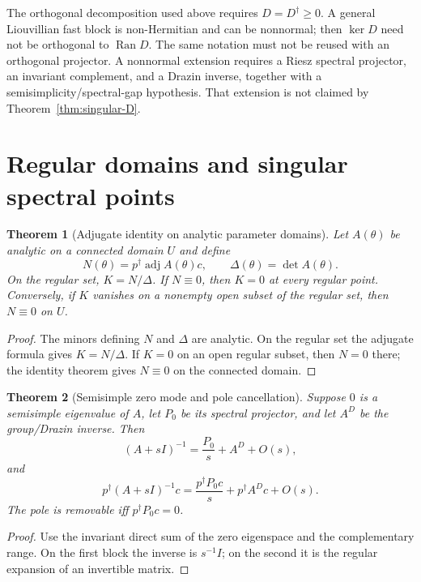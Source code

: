 \documentclass[11pt,a4paper]{article}
\newtheorem{theorem}{Theorem}[section]
\theoremstyle{remark}
\newcommand{\adj}{\operatorname{adj}}
\newcommand{\Ran}{\operatorname{Ran}}
\begin{document}
\begin{scopebox}
The orthogonal decomposition used above requires $D=D^\dagger\ge0$.  A general
Liouvillian fast block is non-Hermitian and can be nonnormal; then
$\ker D$ need not be orthogonal to $\Ran D$.  The same notation must not be
reused with an orthogonal projector.  A nonnormal extension requires a Riesz
spectral projector, an invariant complement, and a Drazin inverse, together
with a semisimplicity/spectral-gap hypothesis.  That extension is not claimed
by Theorem~\ref{thm:singular-D}.
\end{scopebox}

\section{Regular domains and singular spectral points}

\begin{theorem}[Adjugate identity on analytic parameter domains]
Let $A(\theta)$ be analytic on a connected domain $U$ and define
\[
N(\theta)=p^\dagger\adj A(\theta)c,
\qquad
\Delta(\theta)=\det A(\theta).
\]
On the regular set, $K=N/\Delta$.  If $N\equiv0$, then $K=0$ at every regular
point.  Conversely, if $K$ vanishes on a nonempty open subset of the regular
set, then $N\equiv0$ on $U$.
\end{theorem}

\begin{proof}
The minors defining $N$ and $\Delta$ are analytic.  On the regular set the
adjugate formula gives $K=N/\Delta$.  If $K=0$ on an open regular subset, then
$N=0$ there; the identity theorem gives $N\equiv0$ on the connected domain.
\end{proof}

\begin{theorem}[Semisimple zero mode and pole cancellation]
Suppose $0$ is a semisimple eigenvalue of $A$, let $P_0$ be its spectral
projector, and let $A^D$ be the group/Drazin inverse.  Then
\[
(A+sI)^{-1}=\frac{P_0}{s}+A^D+O(s),
\]
and
\[
p^\dagger(A+sI)^{-1}c
=\frac{p^\dagger P_0c}{s}+p^\dagger A^Dc+O(s).
\]
The pole is removable iff $p^\dagger P_0c=0$.
\end{theorem}

\begin{proof}
Use the invariant direct sum of the zero eigenspace and the complementary
range.  On the first block the inverse is $s^{-1}I$; on the second it is the
regular expansion of an invertible matrix.
\end{proof}
\end{document}
